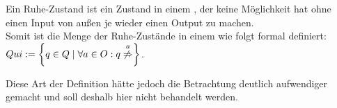 \begin{Def}
  Ein Ruhe-Zustand ist ein Zustand in einem \EIO{}, der keine Möglichkeit hat
  ohne einen Input von außen je wieder einen Output zu machen.\\
  Somit ist die Menge der Ruhe-Zustände in einem \EIO{} wie folgt formal
  definiert: $Qui:=\left\{q\in Q\mid \forall a\in O: q
  \overset{a}{\not{\hspace{-0.1cm}\Rightarrow}}\right\}$.
\end{Def}

Diese Art der Definition hätte jedoch die Betrachtung deutlich aufwendiger
gemacht und soll deshalb hier nicht behandelt werden.
